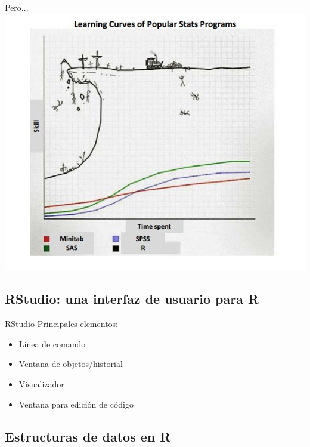 \documentclass{beamer}
\begin{document}
\begin{frame}{Pero...}
      \includegraphics[scale=0.5]{learn}
\end{frame}
  
\subsection{RStudio: una interfaz de usuario para R}
\frame{\tableofcontents[currentsection]}

\begin{frame}{RStudio}
Principales elementos:
     \begin{itemize}
      \item L\'inea de comando
      \item Ventana de objetos/historial
      \item Visualizador
      \item Ventana para edici\'on de c\'odigo
     \end{itemize}
  \end{frame}

\subsection{Estructuras de datos en R}
\frame{\tableofcontents[currentsection]}

\end{document}
